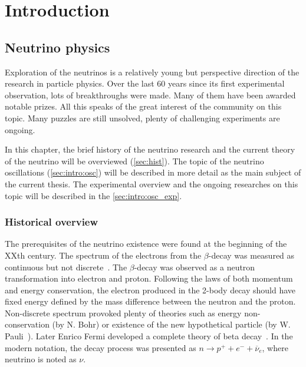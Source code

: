 \documentclass[../main.tex]{subfiles}
\begin{document}
\renewcommand{\labelitemi}{\ding{226}}
\renewcommand{\labelitemii}{\ding{227}}


\part{Introduction}
\label{part:intro:general}

\chapter{Neutrino physics}
\label{ch:nu_phys}
Exploration of the neutrinos is a relatively young but perspective direction of the research in particle physics. Over the last 60 years since its first experimental observation, lots of breakthroughs were made. Many of them have been awarded notable prizes. All this speaks of the great interest of the community on this topic. Many puzzles are still unsolved, plenty of challenging experiments are ongoing.

In this chapter, the brief history of the neutrino research and the current theory of the neutrino will be overviewed (\autoref{sec:hist}). The topic of the neutrino oscillations (\autoref{sec:intro:osc}) will be described in more detail as the main subject of the current thesis. The experimental overview and the ongoing researches on this topic will be described in the \autoref{sec:intro:osc_exp}.

\section{Historical overview}
\label{sec:hist}
The prerequisites of the neutrino existence were found at the beginning of the XXth century. The spectrum of the electrons from the $\beta$-decay was measured as continuous but not discrete~\cite{Chadwick1914}. The $\beta$-decay was observed as a neutron transformation into electron and proton. Following the laws of both momentum and energy conservation, the electron produced in the 2-body decay should have fixed energy defined by the mass difference between the neutron and the proton. Non-discrete spectrum provoked plenty of theories such as energy non-conservation (by N. Bohr) or existence of the new hypothetical particle (by W. Pauli~\cite{Pauli1930}). Later Enrico Fermi developed a complete theory of beta decay~\cite{Fermi1934}. In the modern notation, the decay process was presented as $n\to p^++e^-+\overline{\nu}_e$, where neutrino is noted as $\nu$.
\end{document}
